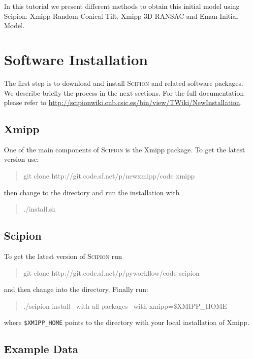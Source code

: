 \documentclass[12pt]{article} %
\newcommand{\scipion}{\textsc{Scipion} }
\newenvironment{command}{\tt\begin{quote}}{\end{quote}}
\begin{document}
In this tutorial we present different methods to obtain this initial
model using Scipion: Xmipp Random Conical Tilt, Xmipp 3D-RANSAC and
Eman Initial Model.

\section{Software Installation}

The first step is to download and install \scipion and related
software packages. We describe briefly the process in the next
sections. For the full documentation please refer to
\url{http://scipionwiki.cnb.csic.es/bin/view/TWiki/NewInstallation}.

\subsection{Xmipp}

One of the main components of \scipion is the Xmipp package. To get
the latest version use:

\begin{command}
git clone http://git.code.sf.net/p/newxmipp/code xmipp
\end{command}

\noindent
then change to the  directory and run the installation with

\begin{command}
./install.sh
\end{command}

\subsection{Scipion}

To get the latest version of \scipion run

\begin{command}
git clone http://git.code.sf.net/p/pyworkflow/code scipion
\end{command}

\noindent
and then change into the  directory. Finally run:

\begin{command}
./scipion install --with-all-packages --with-xmipp=\$XMIPP\_HOME
\end{command}

\noindent
where \verb+$XMIPP_HOME+ points to the directory with your local
installation of Xmipp.

\subsection{Example Data}
\end{document}
